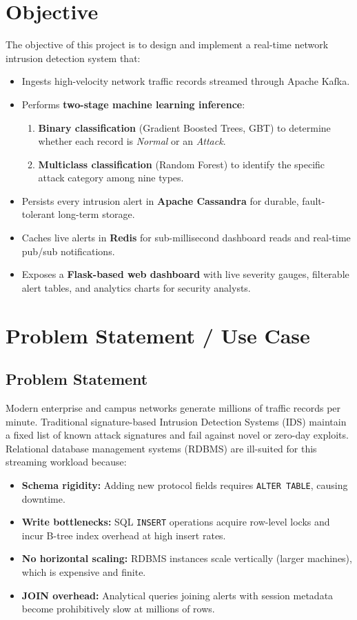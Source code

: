 \documentclass[12pt,a4paper]{report}
\begin{document}
\section{Objective}
The objective of this project is to design and implement a real-time network
intrusion detection system that:
\begin{itemize}
  \item Ingests high-velocity network traffic records streamed through
        Apache Kafka.
  \item Performs \textbf{two-stage machine learning inference}:
        \begin{enumerate}
          \item \textbf{Binary classification} (Gradient Boosted Trees, GBT)
                to determine whether each record is \textit{Normal} or an
                \textit{Attack}.
          \item \textbf{Multiclass classification} (Random Forest) to identify
                the specific attack category among nine types.
        \end{enumerate}
  \item Persists every intrusion alert in \textbf{Apache Cassandra} for
        durable, fault-tolerant long-term storage.
  \item Caches live alerts in \textbf{Redis} for sub-millisecond dashboard
        reads and real-time pub/sub notifications.
  \item Exposes a \textbf{Flask-based web dashboard} with live severity
        gauges, filterable alert tables, and analytics charts for security
        analysts.
\end{itemize}

\section{Problem Statement / Use Case}

\subsection{Problem Statement}
Modern enterprise and campus networks generate millions of traffic records per
minute.  Traditional signature-based Intrusion Detection Systems (IDS)
maintain a fixed list of known attack signatures and fail against novel or
zero-day exploits.  Relational database management systems (RDBMS) are
ill-suited for this streaming workload because:
\begin{itemize}
  \item \textbf{Schema rigidity:} Adding new protocol fields requires
        \texttt{ALTER TABLE}, causing downtime.
  \item \textbf{Write bottlenecks:} SQL \texttt{INSERT} operations acquire
        row-level locks and incur B-tree index overhead at high insert rates.
  \item \textbf{No horizontal scaling:} RDBMS instances scale vertically
        (larger machines), which is expensive and finite.
  \item \textbf{JOIN overhead:} Analytical queries joining alerts with session
        metadata become prohibitively slow at millions of rows.
\end{itemize}
\end{document}
